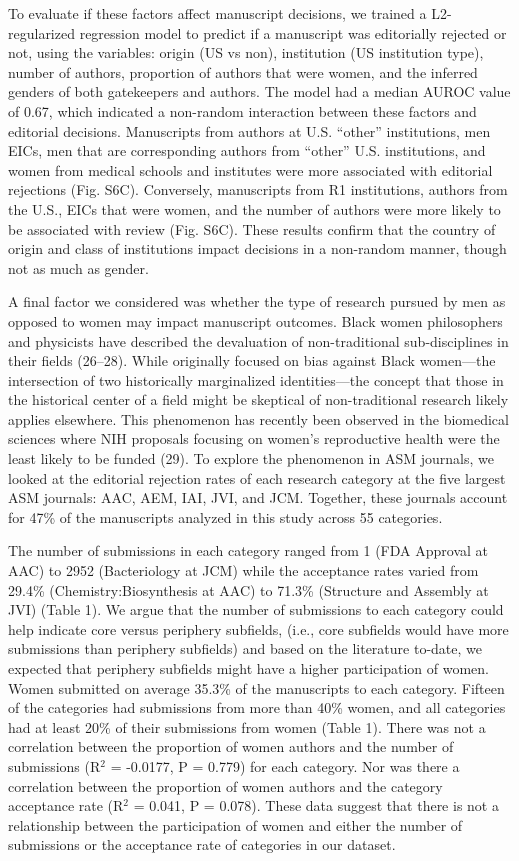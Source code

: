 \documentclass[11pt,]{article}
\begin{document}
To evaluate if these factors affect manuscript decisions, we trained a
L2-regularized regression model to predict if a manuscript was
editorially rejected or not, using the variables: origin (US vs non),
institution (US institution type), number of authors, proportion of
authors that were women, and the inferred genders of both gatekeepers
and authors. The model had a median AUROC value of 0.67, which indicated
a non-random interaction between these factors and editorial decisions.
Manuscripts from authors at U.S. ``other'' institutions, men EICs, men
that are corresponding authors from ``other'' U.S. institutions, and
women from medical schools and institutes were more associated with
editorial rejections (Fig. S6C). Conversely, manuscripts from R1
institutions, authors from the U.S., EICs that were women, and the
number of authors were more likely to be associated with review (Fig.
S6C). These results confirm that the country of origin and class of
institutions impact decisions in a non-random manner, though not as much
as gender.

A final factor we considered was whether the type of research pursued by
men as opposed to women may impact manuscript outcomes. Black women
philosophers and physicists have described the devaluation of
non-traditional sub-disciplines in their fields (26--28). While
originally focused on bias against Black women---the intersection of two
historically marginalized identities---the concept that those in the
historical center of a field might be skeptical of non-traditional
research likely applies elsewhere. This phenomenon has recently been
observed in the biomedical sciences where NIH proposals focusing on
women's reproductive health were the least likely to be funded (29). To
explore the phenomenon in ASM journals, we looked at the editorial
rejection rates of each research category at the five largest ASM
journals: AAC, AEM, IAI, JVI, and JCM. Together, these journals account
for 47\% of the manuscripts analyzed in this study across 55 categories.

The number of submissions in each category ranged from 1 (FDA Approval
at AAC) to 2952 (Bacteriology at JCM) while the acceptance rates varied
from 29.4\% (Chemistry:Biosynthesis at AAC) to 71.3\% (Structure and
Assembly at JVI) (Table 1). We argue that the number of submissions to
each category could help indicate core versus periphery subfields,
(i.e., core subfields would have more submissions than periphery
subfields) and based on the literature to-date, we expected that
periphery subfields might have a higher participation of women. Women
submitted on average 35.3\% of the manuscripts to each category. Fifteen
of the categories had submissions from more than 40\% women, and all
categories had at least 20\% of their submissions from women (Table 1).
There was not a correlation between the proportion of women authors and
the number of submissions (R\({^2}\) = -0.0177, P = 0.779) for each
category. Nor was there a correlation between the proportion of women
authors and the category acceptance rate (R\({^2}\) = 0.041, P = 0.078).
These data suggest that there is not a relationship between the
participation of women and either the number of submissions or the
acceptance rate of categories in our dataset.
\end{document}
